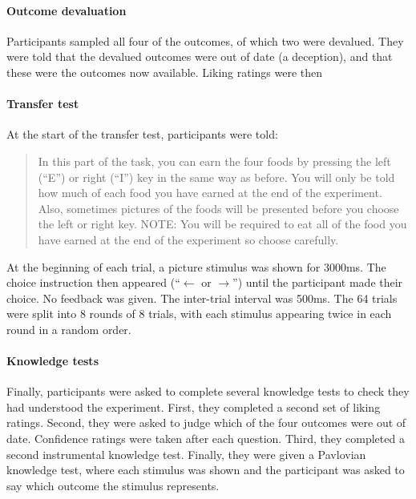 \documentclass[12pt]{article}
\begin{document}
\paragraph{Outcome devaluation}
Participants sampled all four of the outcomes, of which two were devalued. They
were told that the devalued outcomes were out of date (a deception), and that
these were the outcomes now available. Liking ratings were then 

\paragraph{Transfer test}
At the start of the transfer test, participants were told: 

\blockquote{In this part of the task, you can earn the four foods by pressing
the left (``E'') or right (``I'') key in the same way as before. You will only
be told how much of each food you have earned at the end of the experiment.
Also, sometimes pictures of the foods will be presented before you choose the
left or right key. NOTE: You will be required to eat all of the food you have
earned at the end of the experiment so choose carefully.}

At the beginning of each trial, a picture stimulus was shown for 3000ms. The
choice instruction then appeared (``$\leftarrow$ or $\rightarrow$'') until the
participant made their choice. No feedback was given. The inter-trial interval
was 500ms. The 64 trials were split into 8 rounds of 8 trials, with each
stimulus appearing twice in each round in a random order. 

\paragraph{Knowledge tests}
Finally, participants were asked to complete several knowledge tests to check
they had understood the experiment. First, they completed a second set of
liking ratings. Second, they were asked to judge which of the four outcomes 
were out of date. Confidence ratings were taken after each question. Third,
they completed a second instrumental knowledge test. Finally, they were given a
Pavlovian knowledge test, where each stimulus was shown and the participant was
asked to say which outcome the stimulus represents. 
\end{document}
